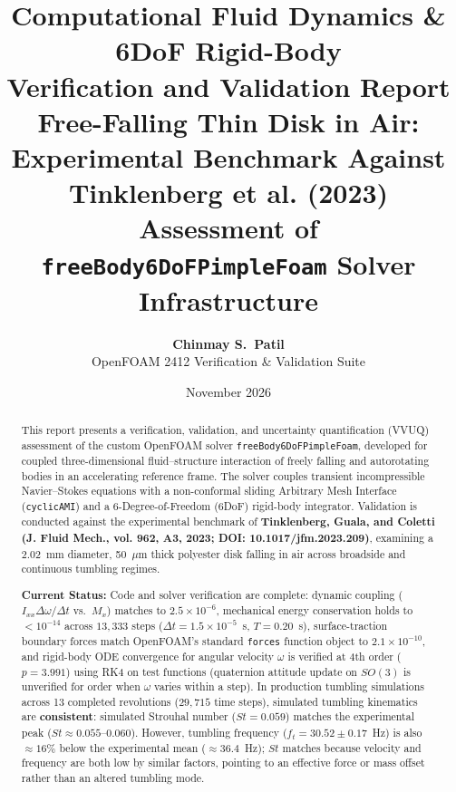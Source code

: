 \documentclass[11pt,a4paper]{article}
\title{\vspace{-10mm}\bfseries\color{foamNavy}\LARGE Computational Fluid Dynamics \& 6DoF Rigid-Body\\Verification and Validation Report\\[3mm]
\large Free-Falling Thin Disk in Air: Experimental Benchmark Against Tinklenberg et al. (2023)\\[1mm]
\normalsize Assessment of \texttt{freeBody6DoFPimpleFoam} Solver Infrastructure}
\author{\textbf{Chinmay S.\ Patil} \\
OpenFOAM 2412 Verification \& Validation Suite}
\date{November 2026}
\begin{document}
\maketitle

\begin{abstract}
\noindent This report presents a verification, validation, and uncertainty quantification (VVUQ) assessment of the custom OpenFOAM solver \texttt{freeBody6DoFPimpleFoam}, developed for coupled three-dimensional fluid--structure interaction of freely falling and autorotating bodies in an accelerating reference frame. The solver couples transient incompressible Navier--Stokes equations with a non-conformal sliding Arbitrary Mesh Interface (\texttt{cyclicAMI}) and a 6-Degree-of-Freedom (6DoF) rigid-body integrator. Validation is conducted against the experimental benchmark of \textbf{Tinklenberg, Guala, and Coletti (J. Fluid Mech., vol. 962, A3, 2023; DOI: 10.1017/jfm.2023.209)}, examining a 2.02~mm diameter, 50~$\mu$m thick polyester disk falling in air across broadside and continuous tumbling regimes.

\medskip
\noindent \textbf{Current Status:} Code and solver verification are complete: dynamic coupling ($I_{xx} \Delta\omega / \Delta t$ vs.\ $M_x$) matches to $2.5 \times 10^{-6}$, mechanical energy conservation holds to $< 10^{-14}$ across $13,333$ steps ($\Delta t = 1.5 \times 10^{-5}$~s, $T = 0.20$~s), surface-traction boundary forces match OpenFOAM's standard \texttt{forces} function object to $2.1 \times 10^{-10}$, and rigid-body ODE convergence for angular velocity $\omega$ is verified at 4th order ($p = 3.991$) using RK4 on test functions (quaternion attitude update on $SO(3)$ is unverified for order when $\omega$ varies within a step). In production tumbling simulations across 13 completed revolutions ($29,715$ time steps), simulated tumbling kinematics are \textbf{consistent}: simulated Strouhal number ($St = 0.059$) matches the experimental peak ($St \approx 0.055$--$0.060$). However, tumbling frequency ($f_t = 30.52 \pm 0.17$~Hz) is also $\approx 16\%$ below the experimental mean ($\approx 36.4$~Hz); $St$ matches because velocity and frequency are both low by similar factors, pointing to an effective force or mass offset rather than an altered tumbling mode.


\end{abstract}
\end{document}
